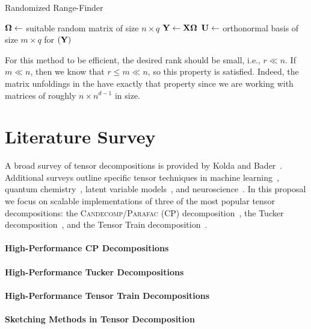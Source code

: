 \begin{algorithm}[htb]
  \caption{Randomized Range-Finder}\label{alg:RRF}
  \begin{algorithmic}[1]
     
    \State $\M{\Omega} \gets$ suitable random matrix of size ${n \times q}$ 
    \State $\M{Y} \gets \M{X}\M{\Omega}$
    \State \label{line:rrf:ortho} $\M{U} \gets$ orthonormal basis of size $m \times q$ for $(\M{Y})$
    \EndProcedure
  \end{algorithmic}
  \label{alg:rrf}
\end{algorithm}

For this method to be efficient, the desired rank should be small, i.e., $r \ll n$.
If $m \ll n$, then we know that $r \leq m \ll n$, so this property is satisfied. Indeed, the matrix
unfoldings in the \MTFSBC have exactly that property since we are working with matrices of roughly 
$n \times n^{d-1}$ in size. 
%
\section{Literature Survey}
A broad survey of tensor decompositions is provided by Kolda and Bader~\cite{Kolda:2009}. Additional surveys outline specific tensor techniques in machine learning~\cite{nikossurvey}, quantum chemistry~\cite{quantumsurvey}, latent variable models~\cite{Anandk}, and neuroscience~\cite{eegsurvey}. In this proposal we focus on scalable implementations of three of the most popular tensor decompositions: the \textsc{Candecomp/Parafac} (CP) decomposition~\cite{hitchcock-sum-1927, CANDECOMP, PARAFAC}, the Tucker decomposition~\cite{Tu66}, and the Tensor Train decomposition~\cite{tensortrain}. 

\paragraph{High-Performance CP Decompositions}

\paragraph{High-Performance Tucker Decompositions}

\paragraph{High-Performance Tensor Train Decompositions}

\paragraph{Sketching Methods in Tensor Decomposition}


